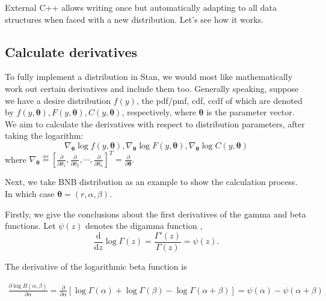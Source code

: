 \documentclass[11pt]{article}
\begin{document}
External C++ allows writing once but automatically adapting to all data structures when faced with a new distribution. Let's see how it works.





\subsection{Calculate derivatives}

To fully implement a distribution in Stan, we would most like mathematically work out certain derivatives and include them too. Generally speaking, suppose we have a desire distribution $f(y)$, the pdf/pmf, cdf, ccdf of which are denoted by $f(y,\boldsymbol\theta), F(y,\boldsymbol\theta), C(y,\boldsymbol\theta)$, respectively, where $\boldsymbol\theta$ is the parameter vector. We aim to calculate the derivatives with respect to distribution parameters, after taking the logarithm:
\begin{equation}
\nabla _{\boldsymbol {\theta}}\log f(y,\boldsymbol\theta), \nabla _{\boldsymbol {\theta}}\log F(y,\boldsymbol\theta), \nabla _{\boldsymbol {\theta}}\log C(y,\boldsymbol\theta)
\end{equation}
where $ \nabla _{\boldsymbol {\theta}}{\overset {\underset {\mathrm {def} }{}}{=}}\left[{\frac {\partial }{\partial \theta_{1}}},{\frac {\partial }{\partial \theta_{2}}},\cdots ,{\frac {\partial }{\partial \theta_{n}}}\right]^{T}={\frac {\partial }{\partial {\boldsymbol {\theta}}}}.$



Next, we take BNB distribution as an example to show the calculation process. In which case $\boldsymbol {\theta}=(r,\alpha,\beta)$. 

Firstly, we give the conclusions about the first derivatives of the gamma and beta functions. Let $\psi(z)$ denotes the digamma function \citep[Ch.~5]{olver2010nist},
\begin{equation}
{\frac {\mathrm {d} }{\mathrm {d} z}}\log \Gamma (z) = {\frac {\Gamma '(z)}{\Gamma (z)}} =\psi (z).
\end{equation}

The derivative of the logarithmic beta function is

\begin{equation}
  \begin{aligned}
  \frac{\partial \log B(\alpha,\beta)}{\partial \alpha} = \frac{\partial}{\partial \alpha}\left[ \log\Gamma(\alpha)+\log\Gamma(\beta)-\log\Gamma(\alpha+\beta) \right] = \psi(\alpha) - \psi(\alpha+\beta)
  \end{aligned}
\end{equation}
\end{document}

